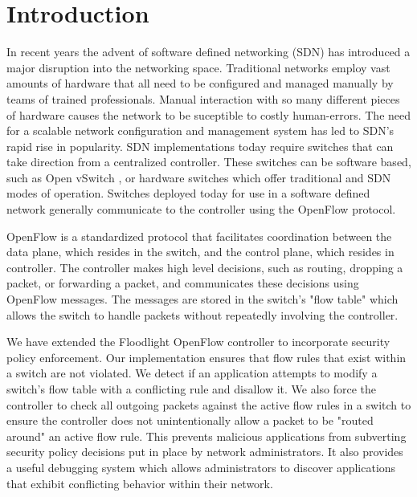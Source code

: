 \section{Introduction}
\label{sec:intro}

In recent years the advent of software defined networking (SDN) has introduced a major disruption into the networking space.
Traditional networks employ vast amounts of hardware that all need to be configured and managed manually by teams of trained professionals.
Manual interaction with so many different pieces of hardware causes the network to be suceptible to costly human-errors. 
The need for a scalable network configuration and management system has led to SDN's rapid rise in popularity.
SDN implementations today require switches that can take direction from a centralized controller.
These switches can be software based, such as Open vSwitch \cite{DBLP:conf/hotnets/PfaffPACKS09}, or hardware switches which offer traditional and SDN modes of operation.
Switches deployed today for use in a software defined network generally communicate to the controller using the OpenFlow protocol.

OpenFlow \cite{McKeown:2008:OEI:1355734.1355746} is a standardized protocol that facilitates coordination between the data plane, which resides in the switch, and the control plane, which resides in controller.
The controller makes high level decisions, such as routing, dropping a packet, or forwarding a packet, and communicates these decisions using OpenFlow messages.
The messages are stored in the switch's "flow table" which allows the switch to handle packets without repeatedly involving the controller. 


We have extended the Floodlight OpenFlow controller \cite{floodlight} to incorporate security policy enforcement.
Our implementation ensures that flow rules that exist within a switch are not violated.
We detect if an application attempts to modify a switch's flow table with a conflicting rule and disallow it.
We also force the controller to check all outgoing packets against the active flow rules in a switch to ensure the controller does not unintentionally allow a packet to be "routed around" an active flow rule.
This prevents malicious applications from subverting security policy decisions put in place by network administrators.
It also provides a useful debugging system which allows administrators to discover applications that exhibit conflicting behavior within their network.

